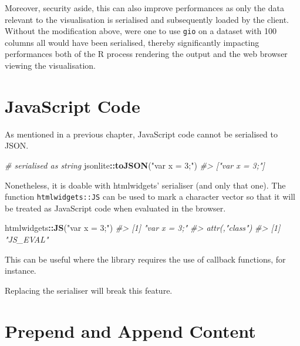 \documentclass[10pt,]{krantz}
\makeatletter
\newenvironment{Shaded}{\begin{snugshade}}{\end{snugshade}}
\newcommand{\CommentTok}[1]{\textcolor[rgb]{0.37,0.37,0.37}{\textit{#1}}}
\newcommand{\KeywordTok}[1]{\textcolor[rgb]{0.27,0.27,0.27}{\textbf{#1}}}
\newcommand{\NormalTok}[1]{#1}
\newcommand{\OperatorTok}[1]{\textcolor[rgb]{0.43,0.43,0.43}{\textbf{#1}}}
\newcommand{\StringTok}[1]{\textcolor[rgb]{0.5,0.5,0.5}{#1}}
\newenvironment{kframe}{%
\medskip{}
\setlength{\fboxsep}{.8em}
 \def\at@end@of@kframe{}%
 \ifinner\ifhmode%
  \def\at@end@of@kframe{\end{minipage}}%
  \begin{minipage}{\columnwidth}%
 \fi\fi%
 \def\FrameCommand##1{\hskip\@totalleftmargin \hskip-\fboxsep
 \colorbox{shadecolor}{##1}\hskip-\fboxsep
     \hskip-\linewidth \hskip-\@totalleftmargin \hskip\columnwidth}%
 \MakeFramed {\advance\hsize-\width
   \@totalleftmargin\z@ \linewidth\hsize
   \@setminipage}}%
 {\par\unskip\endMakeFramed%
 \at@end@of@kframe}
\renewenvironment{Shaded}{\begin{kframe}}{\end{kframe}}
\newenvironment{rmdblock}[1]
  {
  \begin{itemize}
  \renewcommand{\labelitemi}{
    \raisebox{-.7\height}[0pt][0pt]{
      {\setkeys{Gin}{width=3em,keepaspectratio}\texttt{[image: images/\#1]}}
    }
  }
  \setlength{\fboxsep}{1em}
  \begin{kframe}
  \item
  }
  {
  \end{kframe}
  \end{itemize}
  }
\newenvironment{rmdnote}
  {\begin{rmdblock}{note}}
  {\end{rmdblock}}
\makeatother
\begin{document}
Moreover, security aside, this can also improve performances as only the data relevant to the visualisation is serialised and subsequently loaded by the client. Without the modification above, were one to use \texttt{gio} on a dataset with 100 columns all would have been serialised, thereby significantly impacting performances both of the R process rendering the output and the web browser viewing the visualisation.

\hypertarget{widgets-adv-js}{%
\section{JavaScript Code}\label{widgets-adv-js}}

As mentioned in a previous chapter, JavaScript code cannot be serialised to JSON.

\begin{Shaded}
\begin{Highlighting}[]
\CommentTok{# serialised as string}
\NormalTok{jsonlite}\OperatorTok{::}\KeywordTok{toJSON}\NormalTok{(}\StringTok{"var x = 3;"}\NormalTok{)}
\CommentTok{#> ["var x = 3;"]}
\end{Highlighting}
\end{Shaded}

Nonetheless, it is doable with htmlwidgets' serialiser (and only that one). The function \texttt{htmlwidgets::JS} can be used to mark a character vector so that it will be treated as JavaScript code when evaluated in the browser.

\begin{Shaded}
\begin{Highlighting}[]
\NormalTok{htmlwidgets}\OperatorTok{::}\KeywordTok{JS}\NormalTok{(}\StringTok{"var x = 3;"}\NormalTok{)  }
\CommentTok{#> [1] "var x = 3;"}
\CommentTok{#> attr(,"class")}
\CommentTok{#> [1] "JS_EVAL"}
\end{Highlighting}
\end{Shaded}

This can be useful where the library requires the use of callback functions, for instance.

\begin{rmdnote}
Replacing the serialiser will break this feature.
\end{rmdnote}

\hypertarget{widgets-adv-prepend-append}{%
\section{Prepend and Append Content}\label{widgets-adv-prepend-append}}
\end{document}
